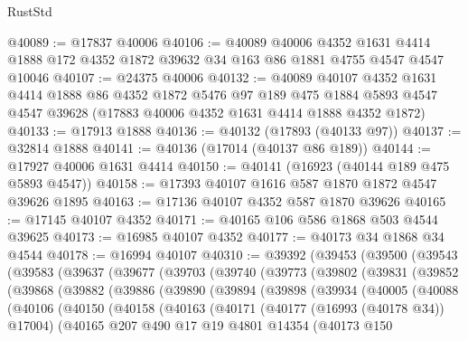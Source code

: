 \begin{lexlean}{RustStd}
\begin{coremodule}
@40089 := @17837 @40006
@40106 := @40089
    @40006
    @4352
    @1631
    @4414
    @1888
    @172
    @4352
    @1872
    @39632
    @34
    @163
    @86
    @1881
    @4755
    @4547
    @4547
    @10046
@40107 := @24375 @40006
@40132 := @40089
    @40107
    @4352
    @1631
    @4414
    @1888
    @86
    @4352
    @1872
    @5476
    @97
    @189
    @475
    @1884
    @5893
    @4547
    @4547
    @39628
    (@17883 @40006 @4352 @1631 @4414 @1888 @4352 @1872)
@40133 := @17913 @1888
@40136 := @40132 (@17893 (@40133 @97))
@40137 := @32814 @1888
@40141 := @40136 (@17014 (@40137 @86 @189))
@40144 := @17927 @40006 @1631 @4414
@40150 := @40141 (@16923 (@40144 @189 @475 @5893 @4547))
@40158 := @17393 @40107 @1616 @587 @1870 @1872 @4547 @39626 @1895
@40163 := @17136 @40107 @4352 @587 @1870 @39626
@40165 := @17145 @40107 @4352
@40171 := @40165 @106 @586 @1868 @503 @4544 @39625
@40173 := @16985 @40107 @4352
@40177 := @40173 @34 @1868 @34 @4544
@40178 := @16994 @40107
@40310 := @39392
    (@39453
      (@39500
        (@39543
          (@39583
            (@39637
              (@39677
                (@39703
                  (@39740
                    (@39773
                      (@39802
                        (@39831
                          (@39852
                            (@39868
                              (@39882
                                (@39886
                                  (@39890
                                    (@39894
                                      (@39898
                                        (@39934
                                          (@40005
                                            (@40088
                                              (@40106
                                                (@40150
                                                  (@40158
                                                    (@40163
                                                      (@40171
                                                        (@40177 (@16993 (@40178 @34)) @17004)
                                                        (@40165
                                                          @207
                                                          @490
                                                          @17
                                                          @19
                                                          @4801
                                                          @14354
                                                          (@40173
                                                            @150

\end{coremodule}
\end{lexlean}
